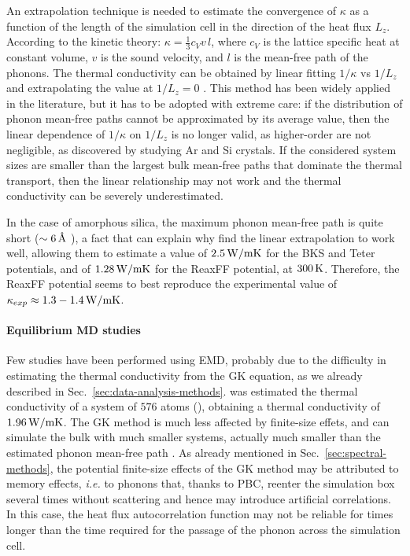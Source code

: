 An extrapolation technique is needed to estimate the convergence of $\kappa$ as a function of the length of the simulation cell in the direction of the heat flux $L_z$. According to the kinetic theory: $\kappa = \frac{1}{3} c_V v \,l$, where $c_V$ is the lattice specific heat at constant volume, $v$ is the sound velocity, and $l$ is the mean-free path of the phonons. The thermal conductivity can be obtained by linear fitting $1/\kappa$ vs $1/L_z$ and extrapolating the value at $1/L_z=0$ \cite{Schelling2002}. This method has been widely applied in the literature, but it has to be adopted with extreme care: if the distribution of phonon mean-free paths cannot be approximated by its average value, then the linear dependence of $1/\kappa$ on $1/L_z$ is no longer valid, as higher-order are not negligible, as discovered by \citet{Sellan2010} studying Ar and Si crystals. If the considered system sizes are smaller than the largest bulk mean-free paths that dominate the thermal transport, then the linear relationship may not work and the thermal conductivity can be severely underestimated.

In the case of amorphous silica, the maximum phonon mean-free path is quite short ($\sim 6\,\mathrm{{\mbox{\AA}}}$ \cite{Yu2006}), a fact that can explain why \citet{Tian2017} find the linear extrapolation to work well, allowing them to estimate a value of $2.5\,\mathrm{W/mK}$ for the BKS and Teter potentials, and of $1.28\,\mathrm{W/mK}$ for the ReaxFF potential, at $300\,\mathrm{K}$. Therefore, the ReaxFF potential seems to best reproduce the experimental value of $\kappa_{exp}\approx 1.3-1.4\,\mathrm{W/mK}$. 


\paragraph{Equilibrium MD studies}
Few studies have been performed using EMD, probably due to the difficulty in estimating the thermal conductivity from the GK equation, as we already described in Sec.~\ref{sec:data-analysis-methods}.
\citet{McGaughey2004b} was estimated the thermal conductivity of a system of $576$ atoms (), obtaining a thermal conductivity of $1.96\,\mathrm{W/mK}$. 
The GK method is much less affected by finite-size effets, and can simulate the bulk with much smaller systems, actually much smaller than the estimated phonon mean-free path \cite{Schelling2002}. As already mentioned in Sec.~\ref{sec:spectral-methods}, the potential finite-size effects of the GK method may be attributed to memory effects, \emph{i.e.} to phonons that, thanks to PBC, reenter the simulation box several times without scattering and hence may introduce artificial correlations. In this case, the heat flux autocorrelation function may not be reliable for times longer than the time required for the passage of the phonon across the simulation cell. 


